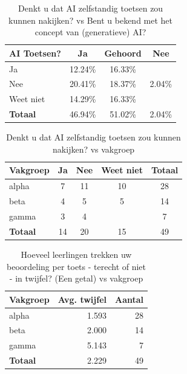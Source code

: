 \documentclass[12pt]{article}
\begin{document}
\noindent
\begin{table}[H]

    \caption{Denkt u dat AI zelfstandig toetsen zou kunnen nakijken? vs Bent u bekend met het concept van (generatieve) AI?}

    \begin{tabular}{l c c c}
        \toprule
        \textbf{AI Toetsen?} & \textbf{Ja} & \textbf{Gehoord} & \textbf{Nee} \\
        \midrule
        Ja      & 12.24\% & 16.33\% &  \\
        Nee     & 20.41\% & 18.37\% & 2.04\% \\
        Weet niet & 14.29\% & 16.33\% &  \\
        \midrule
        \textbf{Totaal} & 46.94\% & 51.02\% & 2.04\% \\
        \bottomrule
    \end{tabular}
\end{table}

\noindent
\begin{table}[H]
    \caption{Denkt u dat AI zelfstandig toetsen zou kunnen nakijken? vs vakgroep}

    \begin{tabular}{l c c c c}
        \toprule
        \textbf{Vakgroep} & \textbf{Ja} & \textbf{Nee} & \textbf{Weet niet} & \textbf{Totaal} \\
        \midrule
        alpha & 7  & 11 & 10 & 28 \\
        beta  & 4  & 5  & 5  & 14 \\
        gamma & 3  & 4  &    & 7  \\
        \midrule
        \textbf{Totaal} & 14 & 20 & 15 & 49 \\
        \bottomrule
    \end{tabular}
\end{table}

\noindent
\begin{table}[H]
    \caption{Hoeveel leerlingen trekken uw beoordeling per toets - terecht of niet - in twijfel? (Een getal) vs vakgroep}
    \begin{tabular}{l r r}
        \toprule
        \textbf{Vakgroep} & \textbf{Avg. twijfel} & \textbf{Aantal} \\
        \midrule
        alpha & 1.593 & 28 \\
        beta  & 2.000 & 14 \\
        gamma & 5.143 & 7 \\
        \midrule
        \textbf{Totaal} & 2.229 & 49 \\
        \bottomrule
    \end{tabular}
\end{table}
\end{document}
